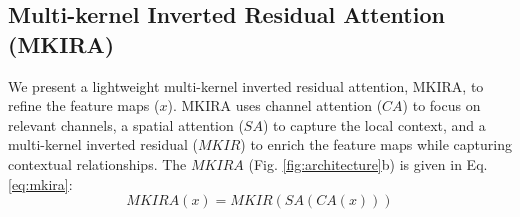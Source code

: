 
\subsection{Multi-kernel Inverted Residual Attention (MKIRA)}
We present a lightweight multi-kernel inverted residual attention, MKIRA, to refine the feature maps ($x$). MKIRA uses channel attention ($CA$) \cite{hu2018squeeze} to focus on relevant channels, a spatial attention ($SA$) \cite{chen2017sca} to capture the local context, and a multi-kernel inverted residual ($MKIR$) to enrich the feature maps while capturing contextual relationships. The $MKIRA$ (Fig. \ref{fig:architecture}b) is given in Eq. \ref{eq:mkira}: 
\begin{equation}
    MKIRA(x) = MKIR(SA(CA(x)))
    \label{eq:mkira}
\end{equation}



